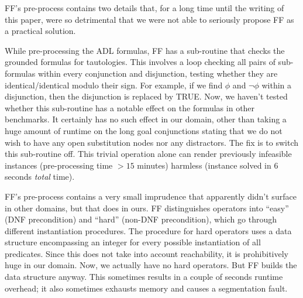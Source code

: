







FF's pre-process contains two details that, for a long time until the
writing of this paper, were so detrimental that we were not able to
seriously propose FF as a practical solution.



While pre-processing the ADL formulas, FF has a sub-routine that
checks the grounded formulas
for tautologies. This involves a loop checking all pairs of
sub-formulas within every conjunction and disjunction, testing whether
they are identical/identical modulo their sign. For example, if we
find $\phi$ and $\neg \phi$ within a disjunction, then the disjunction
is replaced by TRUE. Now, we haven't tested whether this sub-routine
has a notable effect on the formulas in other benchmarks. It certainly
has no such effect in our domain, other than taking a huge amount of
runtime on the long goal conjunctions stating that we do not wish to
have any open substitution nodes nor any distractors. The fix is to
switch this sub-routine off. This trivial operation alone can render
previously infeasible instances (pre-processing time $>15$ minutes)
harmless (instance solved in $6$ seconds {\em total} time).



FF's pre-process contains a very small imprudence that apparently
didn't surface in other domains, but that does in ours. FF
distinguishes operators into ``easy'' (DNF precondition) and ``hard''
(non-DNF precondition), which go through different instantiation
procedures. The procedure for hard operators uses a data structure
encompassing an integer for every possible instantiation of all
predicates. Since this does not take into account reachability, it is
prohibitively huge in our domain. Now, we actually have no hard
operators. But FF builds the data structure anyway. This sometimes
results in a couple of seconds runtime overhead; it also sometimes
exhausts memory and causes a segmentation fault.




















